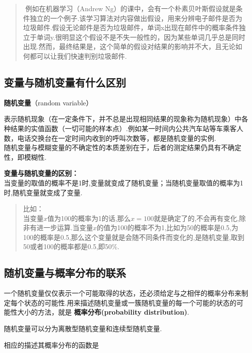 \begin{quote}
​ 例如在机器学习（Andrew
Ng）的课中，会有一个朴素贝叶斯假设就是条件独立的一个例子.该学习算法对内容做出假设，用来分辨电子邮件是否为垃圾邮件.假设无论邮件是否为垃圾邮件，单词x出现在邮件中的概率条件独立于单词y.很明显这个假设不是不失一般性的，因为某些单词几乎总是同时出现.然而，最终结果是，这个简单的假设对结果的影响并不大，且无论如何都可以让我们快速判别垃圾邮件.
\end{quote}

\subsection{变量与随机变量有什么区别}\label{ux53d8ux91cfux4e0eux968fux673aux53d8ux91cfux6709ux4ec0ux4e48ux533aux522b}

\textbf{随机变量}（random variable）

表示随机现象（在一定条件下，并不总是出现相同结果的现象称为随机现象）中各种结果的实值函数（一切可能的样本点）.例如某一时间内公共汽车站等车乘客人数，电话交换台在一定时间内收到的呼叫次数等，都是随机变量的实例.\\
​随机变量与模糊变量的不确定性的本质差别在于，后者的测定结果仍具有不确定性，即模糊性.

\textbf{变量与随机变量的区别：}\\
​当变量的取值的概率不是1时,变量就变成了随机变量；当随机变量取值的概率为1时,随机变量就变成了变量.

\begin{quote}
比如：\\
​
当变量\(x\)值为100的概率为1的话,那么\(x=100\)就是确定了的,不会再有变化,除非有进一步运算.
​
当变量\(x\)的值为100的概率不为1,比如为50的概率是0.5,为100的概率是0.5,那么这个变量就是会随不同条件而变化的,是随机变量,取到50或者100的概率都是0.5,即50\%.
\end{quote}

\subsection{随机变量与概率分布的联系}\label{ux968fux673aux53d8ux91cfux4e0eux6982ux7387ux5206ux5e03ux7684ux8054ux7cfb}

一个随机变量仅仅表示一个可能取得的状态，还必须给定与之相伴的概率分布来制定每个状态的可能性.用来描述随机变量或一簇随机变量的每一个可能的状态的可能性大小的方法，就是
\textbf{概率分布(probability distribution)}.

随机变量可以分为离散型随机变量和连续型随机变量.

相应的描述其概率分布的函数是

